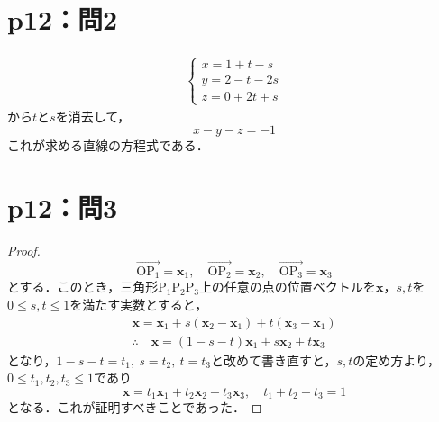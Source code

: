 \documentclass[a4paper,10pt,fleqn]{ltjsarticle}
\begin{document}
\section*{p12：問2}

\begin{tleftbar}
    \begin{align*}
        \begin{cases}
            x=1+t-s   \\
            y=2-t -2s \\
            z=0+2t+s
        \end{cases}
    \end{align*}
    から$t$と$s$を消去して，
    \[
        x-y-z=-1
    \]
    これが求める直線の方程式である．
\end{tleftbar}

\section*{p12：問3}

\begin{tleftbar}
    \begin{proof}
        \[
            \overrightarrow{\mathrm{OP_1}}=\bm{x}_1,\quad \overrightarrow{\mathrm{OP_2}}=\bm{x}_2,\quad \overrightarrow{\mathrm{OP_3}}=\bm{x}_3
        \]
        とする．このとき，三角形$\mathrm{P_1 P_2 P_3}$上の任意の点の位置ベクトルを$\bm{x}$，$s,t$を$0 \le s,t \le 1$を満たす実数とすると，
        \begin{gather*}
            \bm{x}=\bm{x}_1 + s(\bm{x}_2 - \bm{x}_1) + t (\bm{x}_3 - \bm{x}_1) \\
            \therefore \quad \bm{x} = (1-s-t)\bm{x}_1 + s\bm{x}_2 + t \bm{x}_3
        \end{gather*}
        となり，$1-s-t=t_1,~s=t_2,~t=t_3$と改めて書き直すと，$s,t$の定め方より，$0 \le t_1 ,t_2,t_3 \le 1$であり
        \[
            \bm{x} = t_1\bm{x}_1 + t_2\bm{x}_2 + t_3 \bm{x}_3,\quad t_1+t_2+t_3=1
        \]
        となる．これが証明すべきことであった．
    \end{proof}
\end{tleftbar}
%
\newpage
%
\end{document}
